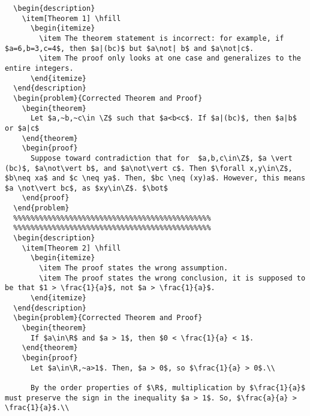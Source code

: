 \documentclass[9pt]{extarticle}
\title{}
\author{Avinash Iyer}
\date{}
\newtheorem{theorem}{Theorem}
\newcommand{\Z}{\mathbb{Z}}
\newcommand{\R}{\mathbb{R}}
\begin{document}
  \begin{lstlisting}
  \begin{description}
    \item[Theorem 1] \hfill
      \begin{itemize}
        \item The theorem statement is incorrect: for example, if $a=6,b=3,c=4$, then $a|(bc)$ but $a\not| b$ and $a\not|c$.
        \item The proof only looks at one case and generalizes to the entire integers.
      \end{itemize}
  \end{description}
  \begin{problem}{Corrected Theorem and Proof}
    \begin{theorem}
      Let $a,~b,~c\in \Z$ such that $a<b<c$. If $a|(bc)$, then $a|b$ or $a|c$
    \end{theorem}
    \begin{proof}
      Suppose toward contradiction that for  $a,b,c\in\Z$, $a \vert (bc)$, $a\not\vert b$, and $a\not\vert c$. Then $\forall x,y\in\Z$, $b\neq xa$ and $c \neq ya$. Then, $bc \neq (xy)a$. However, this means $a \not\vert bc$, as $xy\in\Z$. $\bot$
    \end{proof}
  \end{problem}
  %%%%%%%%%%%%%%%%%%%%%%%%%%%%%%%%%%%%%%%%%%%%%%
  %%%%%%%%%%%%%%%%%%%%%%%%%%%%%%%%%%%%%%%%%%%%%%
  \begin{description}
    \item[Theorem 2] \hfill
      \begin{itemize}
        \item The proof states the wrong assumption.
        \item The proof states the wrong conclusion, it is supposed to be that $1 > \frac{1}{a}$, not $a > \frac{1}{a}$.
      \end{itemize}
  \end{description}
  \begin{problem}{Corrected Theorem and Proof}
    \begin{theorem}
      If $a\in\R$ and $a > 1$, then $0 < \frac{1}{a} < 1$.
    \end{theorem}
    \begin{proof}
      Let $a\in\R,~a>1$. Then, $a > 0$, so $\frac{1}{a} > 0$.\\

      By the order properties of $\R$, multiplication by $\frac{1}{a}$ must preserve the sign in the inequality $a > 1$. So, $\frac{a}{a} > \frac{1}{a}$.\\


\end{lstlisting}
\end{document}
